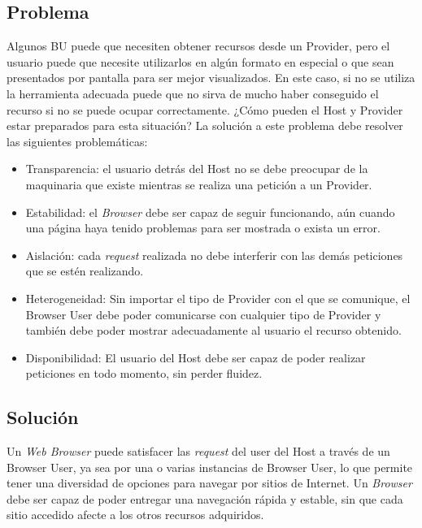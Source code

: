 \subsection{Problema}
Algunos BU puede que necesiten obtener recursos desde un Provider, pero el usuario puede que necesite utilizarlos en algún formato en especial o que sean presentados por pantalla para ser mejor visualizados. En este caso, si no se utiliza la herramienta adecuada puede que no sirva de mucho haber conseguido el recurso si no se puede ocupar correctamente. ¿Cómo pueden el Host y Provider estar preparados para esta situación?
La solución a este problema debe resolver las siguientes problemáticas:
\begin{itemize}
	\item Transparencia: el usuario detrás del Host no se debe preocupar de la maquinaria que existe mientras se realiza una petición a un Provider.
	\item Estabilidad: el \textit{Browser} debe ser capaz de seguir funcionando, aún cuando una página haya tenido problemas para ser mostrada o exista un error.
	\item Aislación: cada \textit{request} realizada no debe interferir con las demás peticiones que se estén realizando.
	\item Heterogeneidad: Sin importar el tipo de Provider con el que se comunique, el Browser User debe poder comunicarse con cualquier tipo de Provider y también debe poder mostrar adecuadamente al usuario el recurso obtenido.
	\item Disponibilidad: El usuario del Host debe ser capaz de poder realizar peticiones en todo momento, sin perder fluidez.
\end{itemize}

\subsection{Solución}
Un \textit{Web Browser} puede satisfacer las \textit{request} del user del Host a través de un Browser User, ya sea por una o varias instancias de Browser User, lo que permite tener una diversidad de opciones para navegar por sitios de Internet. Un \textit{Browser} debe ser capaz de poder entregar una navegación rápida y estable, sin que cada sitio accedido afecte a los otros recursos adquiridos.
